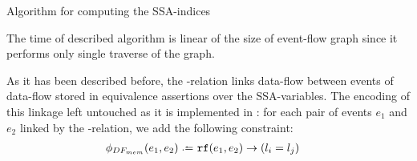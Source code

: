 \begin{algorithm}
    \caption{Algorithm for computing the SSA-indices}\label{alg:compute-ssa}
    \begin{algorithmic}[1]
                         
                        \EndIf
                    \EndFor
                \EndFor
            \EndFor
        \EndFunction
    \end{algorithmic}
    \label{algorithm:ssa-map}
\end{algorithm}

The time of described algorithm is linear of the size of event-flow graph since it performs only single traverse of the graph.

As it has been described before, the \rf-relation links data-flow between events %
of data-flow stored in equivalence assertions over the SSA-variables. 
The encoding of this linkage left untouched as it is implemented in \porthos: for each pair of events $e_1$ and $e_2$ linked by the \rf-relation, we add the following constraint:
%
\begin{align}
\phi_{DF_{mem}}(e_1, e_2) \defeq \ & \mathtt{rf}(e_1, e_2) \rightarrow (l_i = l_j) 
\end{align}

